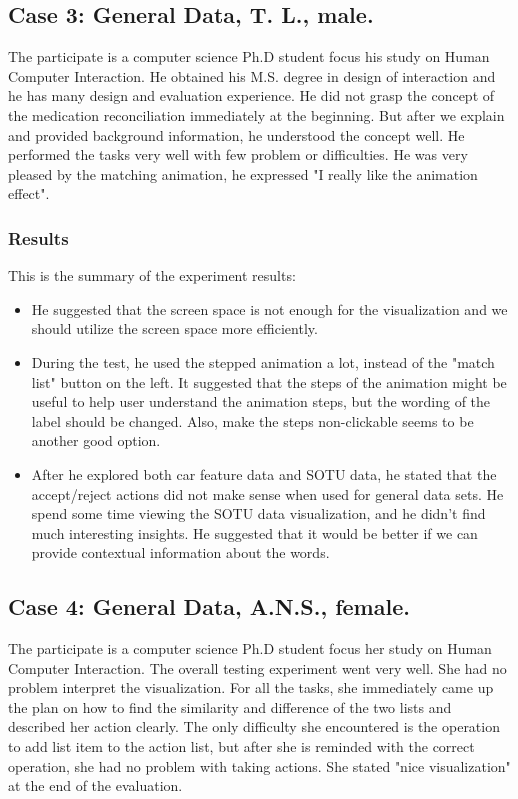 \documentclass{chi2009}
\begin{document}
\subsection{Case 3: General Data, T. L., male.}
The participate is a computer science Ph.D student focus his study on Human Computer Interaction. He obtained his M.S. degree in design of interaction and he has many design and evaluation experience. He did not grasp the concept of the medication reconciliation immediately at the beginning. But after we explain and provided background information, he understood the concept well. He performed the tasks very well with few problem or difficulties. He was very pleased by the matching animation, he expressed "I really like the animation effect". 
\subsubsection{Results}
This is the summary of the experiment results:
\begin{itemize}

\item He suggested that the screen space is not enough for the visualization and we should utilize the screen space more efficiently.

\item During the test, he used the stepped animation a lot, instead of the "match list" button on the left. It suggested that the steps of the animation might be useful to help user understand the animation steps, but the wording of the label should be changed. Also, make the steps non-clickable seems to be another good option. 

\item After he explored both car feature data and SOTU data, he stated that the accept/reject actions did not make sense when used for general data sets. He spend some time viewing the SOTU data visualization, and he didn't find much interesting insights. He suggested that it would be better if we can provide contextual information about the words. 
\end{itemize}



\subsection{Case 4: General Data, A.N.S., female.}
The participate is a computer science Ph.D student focus her study on Human Computer Interaction. The overall testing experiment went very well. She had no problem interpret the visualization. For all the tasks, she immediately came up the plan on how to find the similarity and difference of the two lists and described her action clearly. The only difficulty she encountered is the operation to add list item to the action list, but after she is reminded with the correct operation, she had no problem with taking actions. She stated "nice visualization" at the end of the evaluation.
\end{document}
